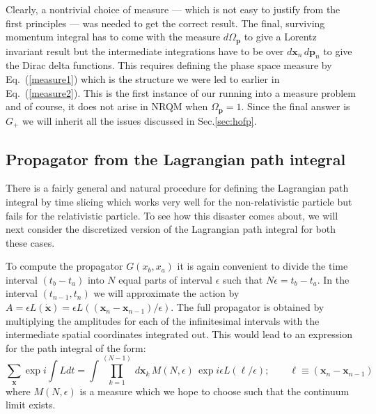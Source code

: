 \documentclass{article}
\def\eq#1{{Eq.~(\ref{#1})}}
\begin{document}
Clearly, a nontrivial choice of measure --- which is not easy to justify from the first principles --- was needed to get the correct result. The final, surviving momentum integral has to come with the measure $d\Omega_{\bm{p}}$ to give a Lorentz invariant result but the intermediate integrations have to be over $d\bm{x}_n \, d\bm{p}_n$ to give the Dirac delta functions. This requires defining the phase space measure by
\eq{measure1} which is the structure we were led to earlier in \eq{measure2}. This is the first instance of our running into a measure problem and of course, it does not arise in NRQM when $\Omega_{\bm{p}}=1$. Since the final answer is $G_+$ we will inherit all the issues discussed in Sec.\ref{sec:hofp}.





\subsection{Propagator from  the Lagrangian path integral}\label{sec:lpi}

There is a fairly general and natural procedure for defining the Lagrangian path integral by time slicing which works very well for the non-relativistic particle but fails for the relativistic particle. To see how this disaster comes about, we will next consider the discretized version of the Lagrangian path integral for both these cases.

To compute the propagator $G(x_b,x_a)$ it is again convenient to divide the time interval $(t_b - t_a)$ into $N$ equal parts of interval $\epsilon$ such that $N\epsilon = t_b - t_a$. In the interval $(t_{n-1},t_n)$ we will approximate the action by $A=\epsilon L(\dot{\bm{x}}) = \epsilon L\left((\bm{x}_n - \bm{x}_{n-1})/\epsilon\right)$. The full propagator is obtained by multiplying the amplitudes for each of the infinitesimal intervals with the intermediate spatial coordinates integrated out. 
 This would lead to an expression for the path integral of the form:
\begin{equation}
\sum_{\bm{x}} \exp i\int L dt = \int \prod_{k=1}^{(N-1)} \, d\bm{x}_k\, M(N,\epsilon) \, \exp i\epsilon L(\bm{\ell}/\epsilon);
\qquad\bm{\ell}\equiv(\bm{x}_n - \bm{x}_{n-1})
\label{disc1}
\end{equation}
where $M(N, \epsilon)$ is a measure which we hope to choose such that the continuum limit exists.
\end{document}
